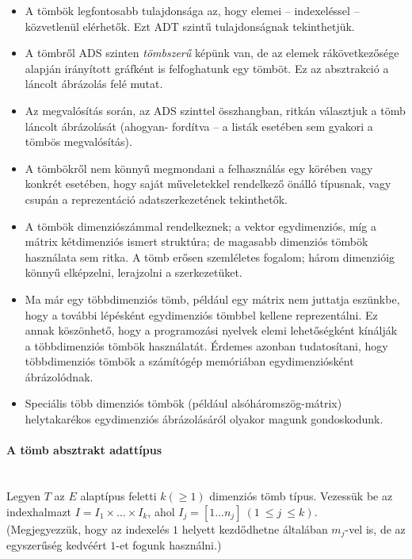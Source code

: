 \documentclass[12pt,margin=0px]{article}
\begin{document}
    \begin{itemize}
        \item A tömbök legfontosabb tulajdonsága az, hogy elemei – indexeléssel – közvetlenül elérhetők. Ezt ADT szintű tulajdonságnak tekinthetjük.
        \item A tömbről ADS szinten \emph{tömbszerű} képünk van, de az elemek rákövetkezősége alapján irányított gráfként is felfoghatunk egy tömböt. Ez az absztrakció a láncolt ábrázolás felé mutat.
        \item Az megvalósítás során, az ADS szinttel összhangban, ritkán választjuk a tömb láncolt ábrázolását (ahogyan- fordítva – a listák esetében sem gyakori a tömbös megvalósítás).
        \item A tömbökről nem könnyű megmondani a felhasználás egy körében vagy konkrét esetében, hogy saját műveletekkel rendelkező önálló típusnak, vagy csupán a reprezentáció adatszerkezetének tekinthetők.
        \item A tömbök dimenziószámmal rendelkeznek; a vektor egydimenziós, míg a mátrix kétdimenziós ismert struktúra; de magasabb dimenziós tömbök használata sem ritka. A tömb erősen szemléletes fogalom; három dimenzióig könnyű elképzelni, lerajzolni a szerkezetüket.
        \item Ma már egy többdimenziós tömb, például egy mátrix nem juttatja eszünkbe, hogy a további lépésként egydimenziós tömbbel kellene reprezentálni. Ez annak köszönhető, hogy a programozási nyelvek elemi lehetőségként kínálják a többdimenziós tömbök használatát. Érdemes azonban tudatosítani, hogy többdimenziós tömbök a számítógép memóriában egydimenziósként ábrázolódnak.
        \item Speciális több dimenziós tömbök (például alsóháromszög-mátrix) helytakarékos egydimenziós ábrázolásáról olyakor magunk gondoskodunk.
    \end{itemize}

    \paragraph{A tömb absztrakt adattípus\\\\}

    \noindent Legyen $T$ az $E$ alaptípus feletti $k(\geq1)$ dimenziós tömb típus. Vezessük be az indexhalmazt $I=I_{1} \times \ldots \times I_{k}$, ahol $I_{j}=[1 \ldots n_{j}]\ (1\ \leq j\ \leq k)$.\\
    (Megjegyezzük, hogy az indexelés $1$ helyett kezdődhetne általában $m_j$-vel is, de az egyszerűség kedvéért $1$-et fogunk használni.)\\
\end{document}
